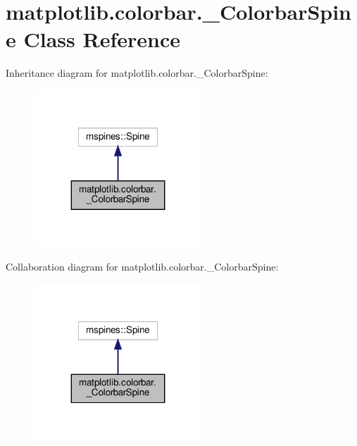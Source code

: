 \hypertarget{classmatplotlib_1_1colorbar_1_1__ColorbarSpine}{}\section{matplotlib.\+colorbar.\+\_\+\+Colorbar\+Spine Class Reference}
\label{classmatplotlib_1_1colorbar_1_1__ColorbarSpine}


Inheritance diagram for matplotlib.\+colorbar.\+\_\+\+Colorbar\+Spine\+:
\nopagebreak
\begin{figure}[H]
\begin{center}
\leavevmode
\includegraphics[width=179pt]{classmatplotlib_1_1colorbar_1_1__ColorbarSpine__inherit__graph}
\end{center}
\end{figure}


Collaboration diagram for matplotlib.\+colorbar.\+\_\+\+Colorbar\+Spine\+:
\nopagebreak
\begin{figure}[H]
\begin{center}
\leavevmode
\includegraphics[width=179pt]{classmatplotlib_1_1colorbar_1_1__ColorbarSpine__coll__graph}
\end{center}
\end{figure}
